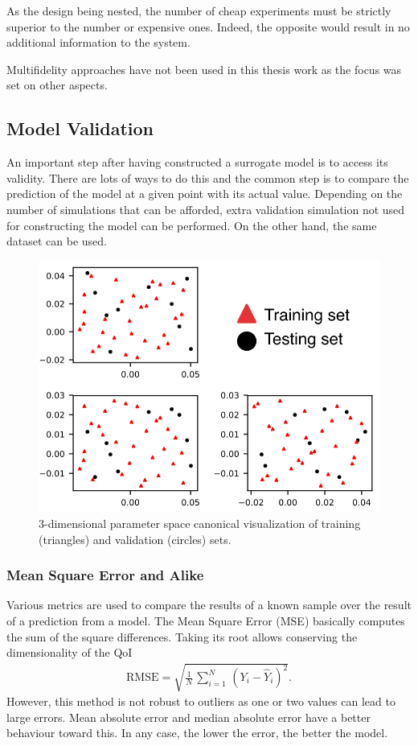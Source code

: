 As the design being nested, the number of cheap experiments must be strictly superior to the number or expensive ones. Indeed, the opposite would result in no additional information to the system.

Multifidelity approaches have not been used in this thesis work as the focus was set on other aspects.

\subsection{Model Validation}\label{sec:validation}

An important step after having constructed a surrogate model is to access its validity. There are lots of ways to do this and the common step is to compare the prediction of the model at a given point with its actual value. Depending on the number of simulations that can be afforded, extra validation simulation not used for constructing the model can be performed. On the other hand, the same dataset can be used.

\begin{figure}[!ht]
\centering
\includegraphics[width=0.7\linewidth,keepaspectratio]{fig/literature/validation_set.png}
\caption{3-dimensional parameter space canonical visualization of training (triangles) and validation (circles) sets.}
\label{fig:validation}
\end{figure}

\subsubsection{Mean Square Error and Alike}
Various metrics are used to compare the results of a known sample over the result of a prediction from a model. The Mean Square Error (MSE) basically computes the sum of the square differences. Taking its root allows conserving the dimensionality of the QoI
\begin{align}
\text{RMSE} = \sqrt{\frac{1}{N}\,
\displaystyle\sum_{i = 1}^{N}\,(Y_i - \hat{Y}_{i})^2}.
\end{align}
However, this method is not robust to outliers as one or two values can lead to large errors. Mean absolute error and median absolute error have a better behaviour toward this. In any case, the lower the error, the better the model.

